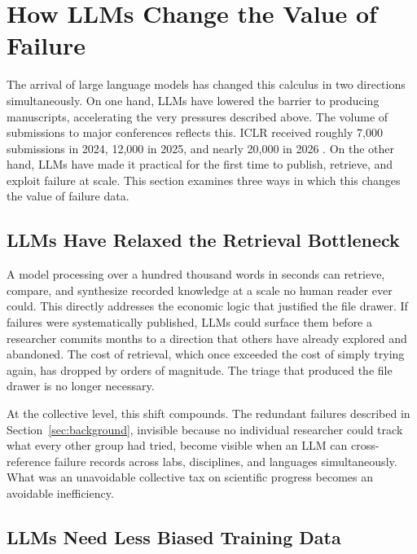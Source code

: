 \section{How LLMs Change the Value of Failure}
\label{sec:opportunity}

The arrival of large language models has changed this calculus in
two directions simultaneously. On one hand, LLMs have lowered the
barrier to producing manuscripts, accelerating the very pressures
described above. The volume of submissions to major conferences
reflects this. ICLR received roughly 7,000 submissions in 2024,
12,000 in 2025, and nearly 20,000 in 2026
\citep{pangram2025iclr}. On the other hand, LLMs have made it
practical for the first time to publish, retrieve, and exploit
failure at scale. This section examines three ways in which this
changes the value of failure data.

\subsection{LLMs Have Relaxed the Retrieval Bottleneck}

A model processing over a hundred thousand words in seconds can
retrieve, compare, and synthesize recorded knowledge at a scale no
human reader ever could. This directly addresses the economic logic
that justified the file drawer. If failures were systematically
published, LLMs could surface them before a researcher commits
months to a direction that others have already explored and
abandoned. The cost of retrieval, which once exceeded the cost of
simply trying again, has dropped by orders of magnitude. The triage
that produced the file drawer is no longer necessary.

At the collective level, this shift compounds. The redundant
failures described in Section~\ref{sec:background}, invisible
because no individual researcher could track what every other group
had tried, become visible when an LLM can cross-reference failure
records across labs, disciplines, and languages simultaneously.
What was an unavoidable collective tax on scientific progress
becomes an avoidable inefficiency.

\subsection{LLMs Need Less Biased Training Data}

